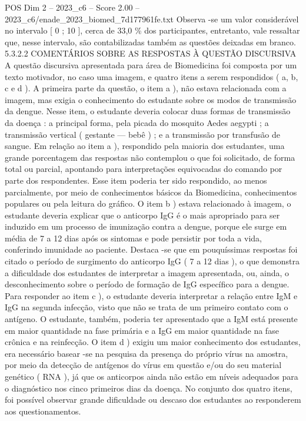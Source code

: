 \begin{textsample}{POS Dim 2 – 2023\_c6 – Score 2.00 – 2023\_c6/enade\_2023\_biomed\_7d177961fe.txt}
Observa -se um valor considerável no intervalo [ 0 ; 10 ], cerca de 33,0 \% dos participantes, entretanto, vale ressaltar que, nesse intervalo, são contabilizadas também as questões deixadas em branco. 5.3.2.2 COMENTÁRIOS SOBRE AS RESPOSTAS À QUESTÃO DISCURSIVA A questão discursiva apresentada para área de Biomedicina foi composta por um texto motivador, no caso uma imagem, e quatro itens a serem respondidos ( a, b, c e d ).
A primeira parte da questão, o item a ), não estava relacionada com a imagem, mas exigia o conhecimento do estudante sobre os modos de transmissão da dengue.
Nesse item, o estudante deveria colocar duas formas de transmissão da doença : a principal forma, pela picada do mosquito Aedes aegypti ; a transmissão vertical ( gestante — bebê ) ; e a transmissão por transfusão de sangue.
Em relação ao item a ), respondido pela maioria dos estudantes, uma grande porcentagem das respostas não contemplou o que foi solicitado, de forma total ou parcial, apontando para interpretações equivocadas do comando por parte dos respondentes.
Esse item poderia ter sido respondido, ao menos parcialmente, por meio de conhecimentos básicos da Biomedicina, conhecimentos populares ou pela leitura do gráfico.
O item b ) estava relacionado à imagem, o estudante deveria explicar que o anticorpo IgG é o mais apropriado para ser induzido em um processo de imunização contra a dengue, porque ele surge em média de 7 a 12 dias após os sintomas e pode persistir por toda a vida, conferindo imunidade ao paciente.
Destaca -se que em pouquíssimas respostas foi citado o período de surgimento do anticorpo IgG ( 7 a 12 dias ), o que demonstra a dificuldade dos estudantes de interpretar a imagem apresentada, ou, ainda, o desconhecimento sobre o período de formação de IgG específico para a dengue.
Para responder ao item c ), o estudante deveria interpretar a relação entre IgM e IgG na segunda infecção, visto que não se trata de um primeiro contato com o antígeno.
O estudante, também, poderia ter apresentado que a IgM está presente em maior quantidade na fase primária e a IgG em maior quantidade na fase crônica e na reinfecção.
O item d ) exigiu um maior conhecimento dos estudantes, era necessário basear -se na pesquisa da presença do próprio vírus na amostra, por meio da detecção de antígenos do vírus em questão e/ou do seu material genético ( RNA ), já que os anticorpos ainda não estão em níveis adequados para o diagnóstico nos cinco primeiros dias da doença.
No conjunto dos quatro itens, foi possível observar grande dificuldade ou descaso dos estudantes ao responderem aos questionamentos.

\end{textsample}
